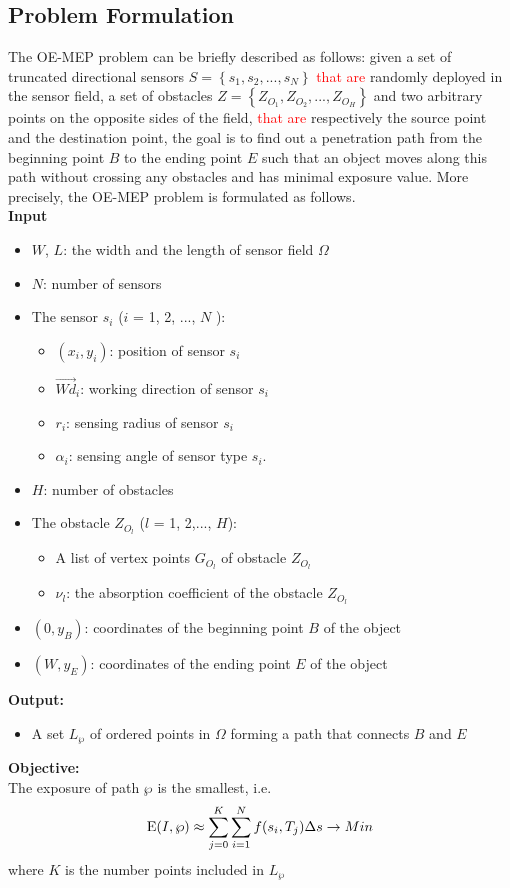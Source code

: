 \documentclass[final]{elsarticle}
\begin{document}
\subsection{Problem Formulation}
The OE-MEP problem can be briefly described as follows: given a set of truncated directional sensors $S = \left\{ {{s_1},{s_2},...,{s_N}} \right\}$ \textcolor{red}{that are }randomly deployed in the sensor field, a set of obstacles $Z = \left\{ {{Z_{O_1}},{Z_{O_2}},...,{Z_{O_H}}} \right\}$ and two arbitrary points on the opposite sides of the field, \textcolor{red}{that are} respectively the source point and the destination point, the goal is to find out a penetration path from the beginning point $B$ to the ending point $E$ such that an object moves along this path without crossing any obstacles and has minimal exposure value. More precisely, the OE-MEP problem is formulated as follows.\\
\textbf{Input}
\begin{itemize}
		\itemsep-0.2em
		\item $W$, $L$: the width and the length of sensor field $\Omega$
		\item $N$: number of sensors
		\item The sensor $s_i$ ($ i $ = 1, 2, ..., $ N $ ):
		\begin{itemize}
			 \item $({x_i},y_i)$: position of sensor $ s_i $
			 \item $\overrightarrow{Wd}_i$: working direction of sensor $s_i$
			 \item $ r_i $: sensing radius of sensor $ s_i $
			 \item ${\alpha _i}$: sensing angle of sensor type $ s_i $.
		 \end{itemize}
		 \item $H$: number of obstacles
		 \item The obstacle $Z_{O_l}$ ($ l $ = 1, 2,..., $H$): 
		 \begin{itemize}
		 	\item A list of vertex points $ G_{O_l} $ of obstacle $Z_{O_l}$
		 	\item $ \nu_l $: the absorption coefficient of the obstacle $Z_{O_l}$
		 \end{itemize}
		\item $(0, y_B)$: coordinates of the beginning point $B$ of the object
		\item $(W, y_E)$: coordinates of the ending point $E$ of the object
\end{itemize}
\textbf{Output:}
\begin{itemize}
	\item A set ${L_\wp }$ of ordered points in $\Omega $ forming a path that connects $ B $ and $ E $ 
\end{itemize}
\textbf{Objective:}\\
The exposure of path  $\wp $ is the smallest, i.e.
\begin{equation}
\label{eq9}
{\rm E}(I,\wp )  \approx \sum\limits_{j = 0}^K {\sum\limits_{i = 1}^N {f({s_i},{T_j})} } \Delta s  \to Min
\end{equation}
where $ K $ is the number points included in ${L_\wp }$
\end{document}
